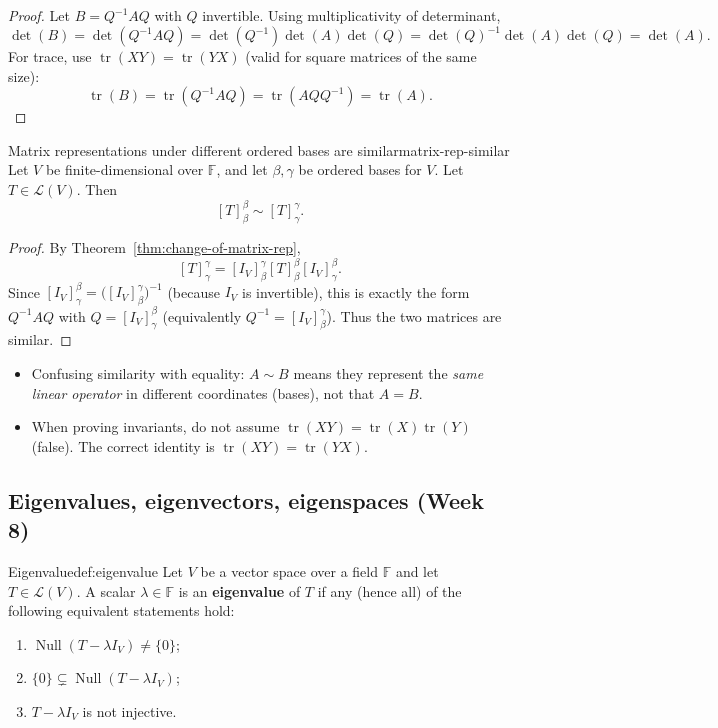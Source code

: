 \begin{proof}
Let $B=Q^{-1}AQ$ with $Q$ invertible.
Using multiplicativity of determinant,
\[
\det(B)=\det(Q^{-1}AQ)=\det(Q^{-1})\det(A)\det(Q)=\det(Q)^{-1}\det(A)\det(Q)=\det(A).
\]
For trace, use $\operatorname{tr}(XY)=\operatorname{tr}(YX)$ (valid for square matrices of the same size):
\[
\operatorname{tr}(B)=\operatorname{tr}(Q^{-1}AQ)=\operatorname{tr}(AQQ^{-1})=\operatorname{tr}(A).
\]
\end{proof}

\begin{theorem}{Matrix representations under different ordered bases are similar}{matrix-rep-similar}
Let $V$ be finite-dimensional over $\mathbb{F}$, and let $\beta,\gamma$ be ordered bases for $V$.
Let $T\in\mathcal{L}(V)$. Then
\[
[T]^{\beta}_{\beta}\sim [T]^{\gamma}_{\gamma}.
\]
\end{theorem}

\begin{proof}
By Theorem~\ref{thm:change-of-matrix-rep},
\[
[T]^{\gamma}_{\gamma}=[I_V]^{\gamma}_{\beta}[T]^{\beta}_{\beta}[I_V]^{\beta}_{\gamma}.
\]
Since $[I_V]^{\beta}_{\gamma}=\bigl([I_V]^{\gamma}_{\beta}\bigr)^{-1}$ (because $I_V$ is invertible),
this is exactly the form $Q^{-1}AQ$ with $Q=[I_V]^{\beta}_{\gamma}$ (equivalently $Q^{-1}=[I_V]^{\gamma}_{\beta}$).
Thus the two matrices are similar.
\end{proof}

\begin{commonmistake}
\begin{itemize}
\item Confusing similarity with equality: $A\sim B$ means they represent the \emph{same linear operator} in different coordinates (bases), not that $A=B$.
\item When proving invariants, do not assume $\operatorname{tr}(XY)=\operatorname{tr}(X)\operatorname{tr}(Y)$ (false). The correct identity is $\operatorname{tr}(XY)=\operatorname{tr}(YX)$.
\end{itemize}
\end{commonmistake}


\subsection{Eigenvalues, eigenvectors, eigenspaces (Week 8)}

\begin{definition}{Eigenvalue}{def:eigenvalue}
Let $V$ be a vector space over a field $\mathbb{F}$ and let $T\in\mathcal{L}(V)$.
A scalar $\lambda\in\mathbb{F}$ is an \textbf{eigenvalue} of $T$ if any (hence all) of the following equivalent statements hold:
\begin{enumerate}
\item $\operatorname{Null}(T-\lambda I_V)\neq \{0\}$;
\item $\{0\}\subsetneq \operatorname{Null}(T-\lambda I_V)$;
\item $T-\lambda I_V$ is not injective.
\end{enumerate}

\end{definition}

